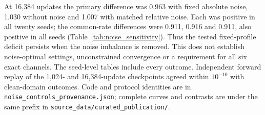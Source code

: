 At 16,384 updates the primary difference was 0.963 with fixed absolute noise,
1.030 without noise and 1.007 with matched relative noise. Each was positive
in all twenty seeds; the common-rate differences were 0.911, 0.916 and
0.911, also positive in all seeds (Table~\ref{tab:noise_sensitivity}).
Thus the tested fixed-profile deficit persists when the noise imbalance is
removed. This does not establish noise-optimal settings, unconstrained
convergence or a requirement for all six exact channels. The seed-level
tables include every outcome. Independent forward replay of the 1,024- and
16,384-update checkpoints agreed within $10^{-10}$ with clean-domain
outcomes. Code and protocol identities are in
\texttt{noise\_controls\_provenance.json}; complete curves and contrasts are
under the same prefix in \texttt{source\_data/curated\_publication/}.

